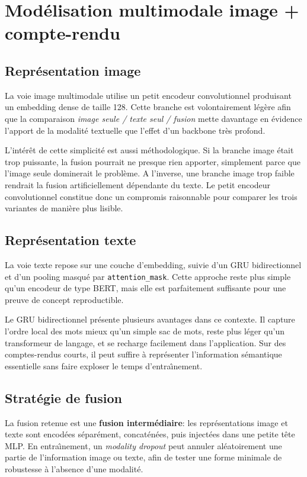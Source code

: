 \documentclass[11pt,a4paper]{article}
\newif\ifsectionbreakenabled
\let\oldsection\section
\renewcommand{\section}[1]{%
    \ifsectionbreakenabled
        \clearpage
    \else
        \sectionbreakenabledtrue
    \fi
    \oldsection{#1}%
}
\begin{document}
\section{Mod\'elisation multimodale image + compte-rendu}
\subsection{Repr\'esentation image}
La voie image multimodale utilise un petit encodeur convolutionnel produisant un embedding dense de taille 128. Cette branche est volontairement l\'eg\`ere afin que la comparaison \emph{image seule / texte seul / fusion} mette davantage en \'evidence l'apport de la modalit\'e textuelle que l'effet d'un backbone tr\`es profond.

L'int\'er\^et de cette simplicit\'e est aussi m\'ethodologique. Si la branche image \'etait trop puissante, la fusion pourrait ne presque rien apporter, simplement parce que l'image seule dominerait le probl\`eme. A l'inverse, une branche image trop faible rendrait la fusion artificiellement d\'ependante du texte. Le petit encodeur convolutionnel constitue donc un compromis raisonnable pour comparer les trois variantes de mani\`ere plus lisible.

\subsection{Repr\'esentation texte}
La voie texte repose sur une couche d'embedding, suivie d'un GRU bidirectionnel et d'un pooling masqu\'e par \texttt{attention\_mask}. Cette approche reste plus simple qu'un encodeur de type BERT, mais elle est parfaitement suffisante pour une preuve de concept reproductible.

Le GRU bidirectionnel pr\'esente plusieurs avantages dans ce contexte. Il capture l'ordre local des mots mieux qu'un simple sac de mots, reste plus l\'eger qu'un transformeur de langage, et se recharge facilement dans l'application. Sur des comptes-rendus courts, il peut suffire \`a repr\'esenter l'information s\'emantique essentielle sans faire exploser le temps d'entra\^\i nement.

\subsection{Strat\'egie de fusion}
La fusion retenue est une \textbf{fusion interm\'ediaire}: les repr\'esentations image et texte sont encod\'ees s\'epar\'ement, concat\'en\'ees, puis inject\'ees dans une petite t\^ete MLP. En entra\^\i nement, un \emph{modality dropout} peut annuler al\'eatoirement une partie de l'information image ou texte, afin de tester une forme minimale de robustesse \`a l'absence d'une modalit\'e.
\end{document}
